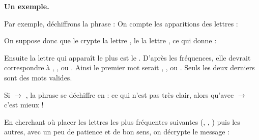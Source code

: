 \documentclass[11pt,class=report,crop=false]{standalone}
\begin{document}
\begin{cours}
\bigskip

\textbf{Un exemple.}

Par exemple, déchiffrons la phrase :
On compte les apparitions des lettres :

On suppose donc que le  crypte la lettre , le  la lettre ,
ce qui donne :


Ensuite la lettre qui apparaît le plus est le . D'après les fréquences, elle devrait correspondre à , ,  ou .
Ainsi le premier mot serait , ,  ou . Seuls les deux derniers sont des mots valides.

Si  $\rightarrow$ , la phrase se déchiffre en :
ce qui n'est pas très clair, alors qu'avec  $\rightarrow$  c'est mieux !

En cherchant où placer les lettres les plus fréquentes suivantes (, , ) puis les autres, avec un peu de patience et de bon sens, on décrypte le message :
 
\end{cours}


\end{document}
